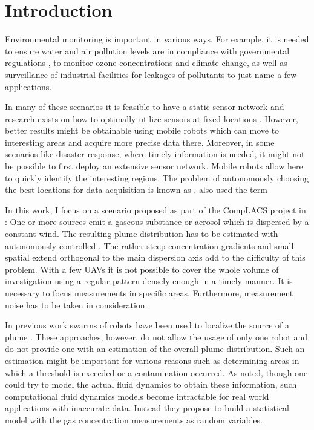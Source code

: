 \chapter{Introduction}
Environmental monitoring is important in various ways.
For example, it is needed to ensure water and air pollution levels are in
compliance with governmental regulations \parencite[i.\,e.][]{Anonymous:1996ui}, 
to monitor ozone concentrations and climate change,  as well as surveillance of 
industrial facilities for leakages of pollutants to just name a few 
applications.

In many of these scenarios it is feasible to have a static sensor network and
research exists on how to optimally utilize sensors at fixed locations
\parencite[e.g.][]{Osborne:2008hi, Guestrin:2005cq, Wang:kz}.  However, better
results might be obtainable using mobile robots which can move to interesting
areas and acquire more precise data there. Moreover, in some scenarios like
disaster response, where timely information is needed, it might not be possible
to first deploy an extensive sensor network. Mobile robots allow here to quickly
identify the interesting regions. The problem of autonomously choosing the
best locations for data acquisition is known as . \textcite{Marchant:2012wb} also used the term 

In this work, I focus on a scenario proposed as part of the CompLACS project in 
\textcite{denardi2013rn}: One or more sources emit a gaseous substance or 
aerosol which is dispersed by a constant wind. The resulting plume distribution 
has to be estimated with autonomously controlled . The rather steep concentration gradients and small spatial 
extend orthogonal to the main dispersion axis add to the difficulty of this 
problem.  With a few UAVs it is not possible to cover the whole volume of 
investigation using a regular pattern densely enough in a timely manner.  It is 
necessary to focus measurements in specific areas.  Furthermore, measurement 
noise has to be taken in consideration.

In previous work swarms of robots have been used to localize the source of 
a plume \parencite{Jatmiko:2007df, Zarzhitsky:2005tz}. These approaches, 
however, do not allow the usage of only one robot and do not provide one with an 
estimation of the overall plume distribution. Such an estimation might be 
important for various reasons such as determining areas in which a threshold is 
exceeded or a contamination occurred. As \textcite{Reggente:2009ti} noted, 
though one could try to model the actual fluid dynamics to obtain these 
information, such computational fluid dynamics models become intractable for 
real world applications with inaccurate data.  Instead they propose to build 
a statistical model with the gas concentration measurements as random variables.

